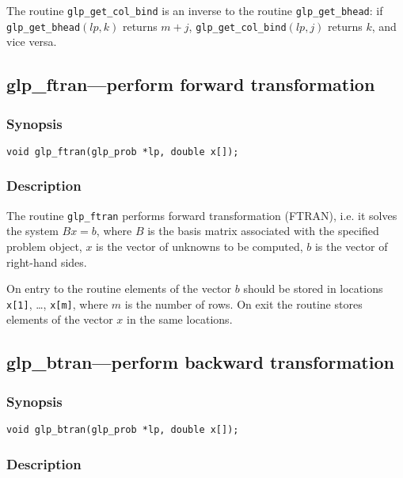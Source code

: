 The routine \verb|glp_get_col_bind| is an inverse to the routine
\verb|glp_get_bhead|: if \verb|glp_get_bhead|$(lp,k)$ returns $m+j$,
\verb|glp_get_col_bind|$(lp,j)$ returns $k$, and vice versa.


\newpage

\subsection{glp\_ftran---perform forward transformation}

\subsubsection*{Synopsis}

\begin{verbatim}
void glp_ftran(glp_prob *lp, double x[]);
\end{verbatim}

\subsubsection*{Description}

The routine \verb|glp_ftran| performs forward transformation (FTRAN),
i.e. it solves the system $Bx=b$, where $B$ is the basis matrix
associated with the specified problem object, $x$ is the vector of
unknowns to be computed, $b$ is the vector of right-hand sides.

On entry to the routine elements of the vector $b$ should be stored in
locations \verb|x[1]|, \dots, \verb|x[m]|, where $m$ is the number of
rows. On exit the routine stores elements of the vector $x$ in the same
locations.

\subsection{glp\_btran---perform backward transformation}

\subsubsection*{Synopsis}

\begin{verbatim}
void glp_btran(glp_prob *lp, double x[]);
\end{verbatim}

\subsubsection*{Description}


